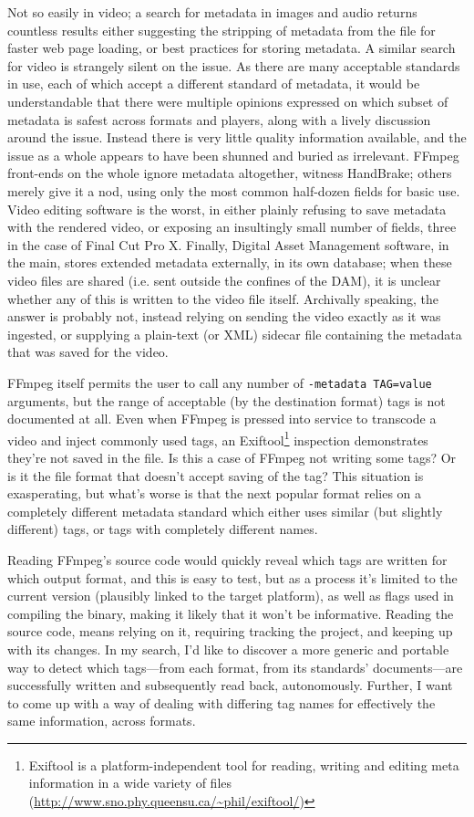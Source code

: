 \documentclass{article}
\begin{document}
Not so easily in video; a search for metadata in images and audio returns
countless results either suggesting the stripping of metadata from the file for
faster web page loading, or best practices for storing metadata. A similar
search for video is strangely silent on the issue. As there are many acceptable
standards in use, each of which accept a different standard of metadata, it
would be understandable that there were multiple opinions expressed on which
subset of metadata is safest across formats and players, along with a lively
discussion around the issue. Instead there is very little quality information
available, and the issue as a whole appears to have been shunned and buried as
irrelevant. FFmpeg front-ends on the whole ignore metadata altogether, witness
HandBrake; others merely give it a nod, using only the most common half-dozen
fields for basic use. Video editing software is the worst, in either plainly
refusing to save metadata with the rendered video, or exposing an insultingly
small number of fields, three in the case of Final Cut Pro X. Finally, Digital
Asset Management software, in the main, stores extended metadata externally, in
its own database; when these video files are shared (i.e. sent outside the
confines of the DAM), it is unclear whether any of this is written to the video
file itself. Archivally speaking, the answer is probably not, instead relying on
sending the video exactly as it was ingested, or supplying a plain-text (or XML)
sidecar file containing the metadata that was saved for the video.

FFmpeg itself permits the user to call any number of \texttt{-metadata TAG=value}
arguments, but the range of acceptable (by the destination format) tags is not
documented at all. Even when FFmpeg is pressed into service to transcode a video
and inject commonly used tags, an Exiftool\footnote{Exiftool is a platform-independent tool for reading, writing and editing
meta information in a wide variety of files (\href{http://www.sno.phy.queensu.ca/\~phil/exiftool/}{\url{http://www.sno.phy.queensu.ca/\~phil/exiftool/}})} inspection demonstrates they're not
saved in the file. Is this a case of FFmpeg not writing some tags? Or is it
the file format that doesn't accept saving of the tag? This situation is
exasperating, but what's worse is that the next popular format relies on a
completely different metadata standard which either uses similar (but slightly
different) tags, or tags with completely different names.

Reading FFmpeg's source code would quickly reveal which tags are written for
which output format, and this is easy to test, but as a process it's limited to
the current version (plausibly linked to the target platform), as well as flags
used in compiling the binary, making it likely that it won't be informative.
Reading the source code, means relying on it, requiring tracking the project,
and keeping up with its changes. In my search, I'd like to discover a more
generic and portable way to detect which tags---from each format, from its
standards' documents---are successfully written and subsequently read back,
autonomously. Further, I want to come up with a way of dealing with differing
tag names for effectively the same information, across formats.
\end{document}
